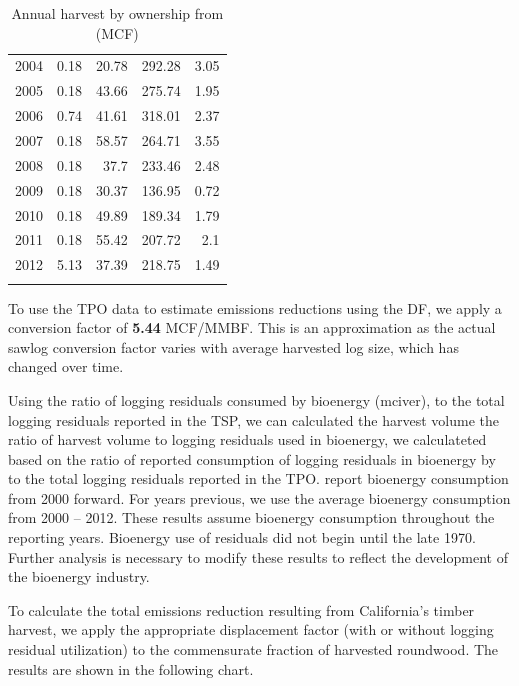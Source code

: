 \documentclass[a4paper]{article}
\begin{document}
\begin{longtable}{rrrrr}
2004 & 0.18 & 20.78 & 292.28 & 3.05\\
2005 & 0.18 & 43.66 & 275.74 & 1.95\\
2006 & 0.74 & 41.61 & 318.01 & 2.37\\
2007 & 0.18 & 58.57 & 264.71 & 3.55\\
2008 & 0.18 & 37.7 & 233.46 & 2.48\\
2009 & 0.18 & 30.37 & 136.95 & 0.72\\
2010 & 0.18 & 49.89 & 189.34 & 1.79\\
2011 & 0.18 & 55.42 & 207.72 & 2.1\\
2012 & 5.13 & 37.39 & 218.75 & 1.49\\
\caption{Annual harvest by ownership from \citet{Mciver2012} (MCF)\label{tab:MandM}}
\\
\end{longtable}

To use the TPO data to estimate emissions reductions using the DF, we apply a
conversion factor of \textbf{5.44} MCF/MMBF. This is an approximation as the
actual sawlog conversion factor varies with average harvested log size, which has changed over time.  


Using the ratio of logging residuals consumed by bioenergy (mciver), to the total logging residuals reported in the TSP, we can calculated the harvest volume the ratio of harvest volume to logging residuals used in bioenergy,
we calculateted 
based on the ratio of reported consumption of logging residuals in
bioenergy by \citeauthor{Mciver2012} to the total logging residuals reported
in the TPO. \citeauthor{Mciver2012} report bioenergy consumption from 2000
forward. For years previous, we use the average bioenergy consumption
from 2000 -- 2012. These results assume bioenergy consumption
throughout the reporting years. Bioenergy use of residuals did not
begin until the late 1970. Further analysis is necessary to modify
these results to reflect the development of the bioenergy industry.

To calculate the total emissions reduction resulting from California's
timber harvest, we apply the appropriate displacement factor (with or
without logging residual utilization) to the commensurate fraction of
harvested roundwood. The results are shown in the following chart.
\end{document}
